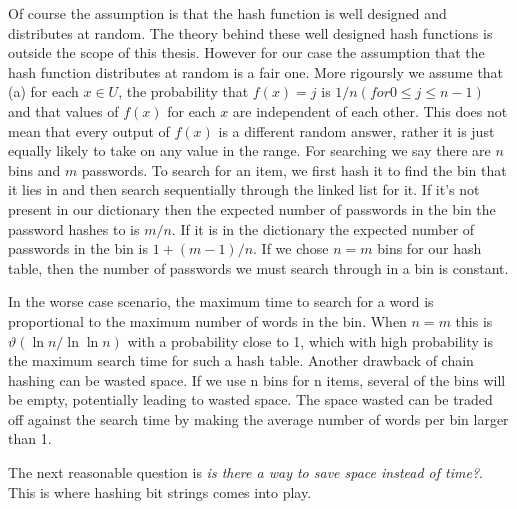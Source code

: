 \documentclass[MScCS]{uccthesis}
\begin{document}
Of course the assumption is that the hash function is well designed and distributes at random. The theory behind these well designed hash functions is outside the scope of this thesis. However for our case the assumption that the hash function distributes at random is a fair one. More rigoursly we assume that (a) for each $x \in U$, the probability  that $f(x)= j$ is $ 1 / n  (for 0 \leq j \leq n -1)$ and that values of $f(x)$ for each $x$ are independent of each other. This does not mean that every output of $f(x)$ is a different random answer, rather it is just equally likely to take on any value in the range. For searching we say there are $n$ bins and $m$ passwords. To search for an item, we first hash it to find the bin that it lies in and then search sequentially through
the linked list for it. If it's not present in our dictionary then the expected number of passwords in the bin the password hashes to is $m/n$. If it is in the dictionary the expected number of passwords in the bin is $1 + (m - 1)/n$. If we chose $n = m$ bins for our hash table, then the number of passwords we must search through in a bin is constant.

In the worse case scenario, the maximum time to search for a word is proportional to the maximum number of words in the bin. When $n = m $ this is $ \vartheta(\ln n / \ln \ln n)$ with a probability close to 1, which with high probability is the maximum search time for such a hash table. Another drawback of chain hashing can be wasted space. If we use n bins for n items, several of the bins will be empty, potentially leading to wasted space. The space wasted can be traded off against the search time by making the average number of words per bin larger than 1.

The next reasonable question is \textit{is there a way to save space instead of time?}. This is where hashing bit strings comes into play.
\end{document}

